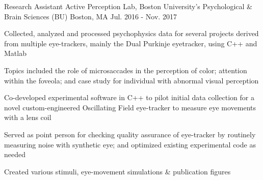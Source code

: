 \begin{cventries}
    {Research Assistant}
    {Active Perception Lab, Boston University's Psychological \& Brain Sciences (BU)}
    {Boston, MA}
    {Jul. 2016 - Nov. 2017}
    {
      \begin{cvitems}
	\item {Collected, analyzed and processed psychophysics data for several projects derived from multiple eye-trackers, mainly the Dual Purkinje eyetracker, using C++ and Matlab}
        \item {Topics included the role of microsaccades in the perception of color; attention within the foveola; and case study for individual with abnormal visual perception}      
        \item {Co-developed experimental software in C++ to pilot initial data collection for a novel custom-engineered Oscillating Field eye-tracker to measure eye movements with a lens coil}
        \item{Served as point person for checking quality assurance of eye-tracker by routinely measuring noise with synthetic eye; and optimized existing experimental code as needed}
        \item {Created various stimuli, eye-movement simulations \& publication figures}
      \end{cvitems}
    }
\end{cventries}
